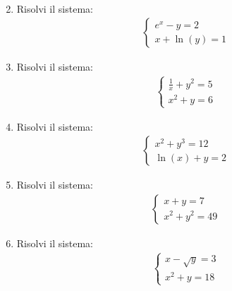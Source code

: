 \documentclass[letterpaper,10pt,italian]{jupyterBook}
\begin{document}
\begin{enumerate}
\begin{equation*}
\begin{split}
    \end{split}
\end{equation*}
\item {} 
\sphinxAtStartPar
Risolvi il sistema:
\begin{equation*}
\begin{split}
    \begin{cases}
    e^x - y = 2 \\
    x + \ln(y) = 1
    \end{cases}
    \end{split}
\end{equation*}
\item {} 
\sphinxAtStartPar
Risolvi il sistema:
\begin{equation*}
\begin{split}
    \begin{cases}
    \frac{1}{x} + y^2 = 5 \\
    x^2 + y = 6
    \end{cases}
    \end{split}
\end{equation*}
\item {} 
\sphinxAtStartPar
Risolvi il sistema:
\begin{equation*}
\begin{split}
    \begin{cases}
    x^2 + y^3 = 12 \\
    \ln(x) + y = 2
    \end{cases}
    \end{split}
\end{equation*}
\item {} 
\sphinxAtStartPar
Risolvi il sistema:
\begin{equation*}
\begin{split}
    \begin{cases}
    x + y = 7 \\
    x^2 + y^2 = 49
    \end{cases}
    \end{split}
\end{equation*}
\item {} 
\sphinxAtStartPar
Risolvi il sistema:
\begin{equation*}
\begin{split}
    \begin{cases}
    x - \sqrt{y} = 3 \\
    x^2 + y = 18
    \end{cases}
    \end{split}
\end{equation*}

\end{enumerate}
\end{document}
